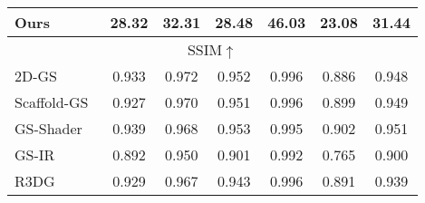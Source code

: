 \begin{table}
{\begin{tabular}{lcccccc}
Ours & \cellcolor{yzysecond}28.32                          & \cellcolor{yzysecond}32.31                         & \cellcolor{yzysecond}28.48                        & \cellcolor{yzybest}46.03        & \cellcolor{yzysecond}23.08                          &  \cellcolor{yzybest}31.44                        \\ \hline 





\multicolumn{7}{c}{SSIM$\uparrow$}                                                                                                                                                                                                                                            \\ \hline
2D-GS~\cite{Huang2DGS2024}        & \cellcolor{yzythird}0.933                   & \cellcolor{yzybest}0.972                    & \cellcolor{yzysecond}0.952                   & \cellcolor{yzysecond}0.996                   & 0.886              &  0.948                          \\

Scaffold-GS~\cite{lu2024scaffold}      & 0.927                    & \cellcolor{yzythird}0.970                     & \cellcolor{yzythird}0.951                    & \cellcolor{yzysecond}0.996                  & \cellcolor{yzythird}0.899                          & \cellcolor{yzythird}0.949                            \\

GS-Shader~\cite{jiang2024gaussianshader}    & \cellcolor{yzybest}0.939                     & 0.968                  & \cellcolor{yzybest}0.953                    & \cellcolor{yzythird}0.995                   & \cellcolor{yzybest}0.902                         & \cellcolor{yzysecond}0.951                                    \\

GS-IR~\cite{liang2024gs} & 0.892 & 0.950 & 0.901 & 0.992 & 0.765 & 0.900  \\ 

R3DG~\cite{gao2023relightable}    &  0.929                    & 0.967                    &   0.943                 &  \cellcolor{yzysecond}0.996                  &   0.891                      &  0.939                                                                                                                                                                                                                                                                     \\


\end{tabular}}
\end{table}
